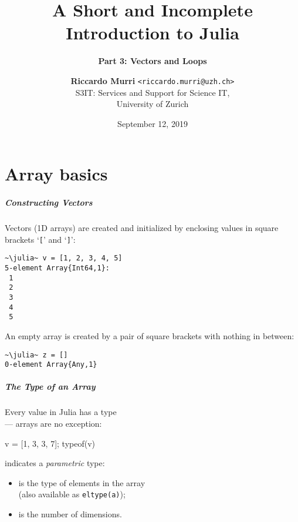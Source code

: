 \documentclass[english,serif,mathserif,xcolor=pdftex,dvipsnames,table]{beamer}
\title[3. Arrays]{%
  A Short and Incomplete Introduction to Julia
}
\subtitle{\bfseries Part 3: Vectors and Loops}
\author[R.~Murri]{%
  \textbf{Riccardo Murri} \texttt{<riccardo.murri@uzh.ch>}
  \\
  S3IT: Services and Support for Science IT,
  \\
  University of Zurich
}
\date{September 12, 2019}
\begin{document}
\maketitle

\part{Array basics}
\begin{frame}
  \frametitle{Constructing Vectors}

  Vectors (1D arrays) are created and initialized by enclosing values
  in square brackets `\texttt{[}' and `\texttt{]}':
\begin{lstlisting}
~\julia~ v = [1, 2, 3, 4, 5]
5-element Array{Int64,1}:
 1
 2
 3
 4
 5
\end{lstlisting}

  \+
  An empty array is created by a pair of square brackets with
  nothing in between:
\begin{lstlisting}
~\julia~ z = []
0-element Array{Any,1}
\end{lstlisting}
\end{frame}


\begin{frame}[fragile]
  \frametitle{The Type of an Array}
  Every value in Julia has a type \\ --- arrays are no exception:
\begin{semiverbatim}
\julia v = [1, 3, 3, 7];
\julia typeof(v)
\end{semiverbatim}

  \+
  \texttt{} indicates a \emph{parametric} type:
  \begin{itemize}
  \item \texttt{} is the type of elements in the array \\ (also available as \texttt{eltype(a)});
  \item \texttt{} is the number of dimensions.
  \end{itemize}
\end{frame}
\end{document}
